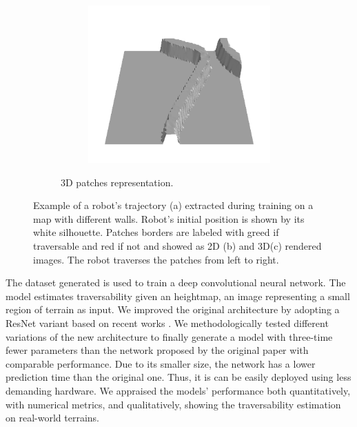 \documentclass[../document.tex]{subfiles}
\begin{document}
\begin{figure} [htbp]
\begin{subfigure}[b]{1\textwidth}
\begin{subfigure}[b]{0.24\textwidth}
    \includegraphics[width=\linewidth]{../img/bars1-example-patches/3d/14.png}    
    \end{subfigure}  
\caption{3D patches representation.}
\label{fig : patch-extraction}
\end{subfigure}
\caption{Example of a robot's trajectory (a) extracted during training on a map with different walls. Robot's initial position is shown by its white silhouette. Patches borders are labeled with greed if traversable and red if not and showed as 2D (b) and 3D(c) rendered images. The robot traverses the patches from left to right.}
\end{figure}

The dataset generated is used to train a deep convolutional neural network. The model estimates traversability given an heightmap, an image representing a small region of terrain as input. We improved the original architecture by adopting a ResNet variant based on recent works \cite{he2015deep} \cite{he2015identity} \cite{hu2017squeeze}. We methodologically tested different variations of the new architecture to finally generate a model with three-time fewer parameters than the network proposed by the original paper \cite{omar2018traversability} with comparable performance. Due to its smaller size, the network has a lower prediction time than the original one. Thus, it is can be easily deployed using less demanding hardware. We appraised the models' performance both quantitatively, with numerical metrics, and qualitatively, showing the traversability estimation on real-world terrains.
\end{document}
